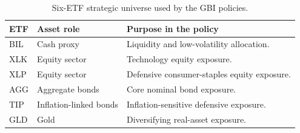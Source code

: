 \begin{table}[htbp]
\centering
\footnotesize
\caption{Six-ETF strategic universe used by the GBI policies.}
\label{tab:gbi-etf-universe}
\begin{tabular}{lll}
\toprule
ETF & Asset role & Purpose in the policy \\
\midrule
BIL & Cash proxy & Liquidity and low-volatility allocation. \\
XLK & Equity sector & Technology equity exposure. \\
XLP & Equity sector & Defensive consumer-staples equity exposure. \\
AGG & Aggregate bonds & Core nominal bond exposure. \\
TIP & Inflation-linked bonds & Inflation-sensitive defensive exposure. \\
GLD & Gold & Diversifying real-asset exposure. \\
\bottomrule
\end{tabular}
\end{table}
